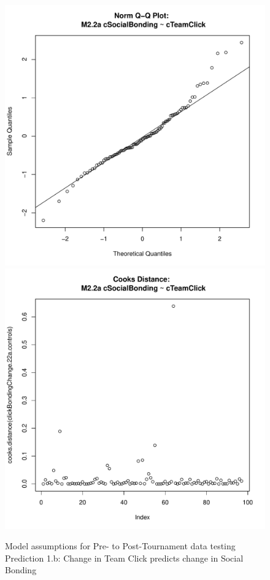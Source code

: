 \begin{CJK}{UTF8}{gbsn}
\begin{figure}[htbp]
        \includegraphics[scale =.4]{images/MLM22aQQNorm.pdf}
        \includegraphics[scale =.4]{images/MLM22aCooksD.pdf}
        \caption{Model assumptions for Pre- to Post-Tournament data testing Prediction 1.b: Change in Team Click predicts change in Social Bonding}
        \label{fig:MLM22aAssumptions}
      \end{figure}






\end{CJK}
